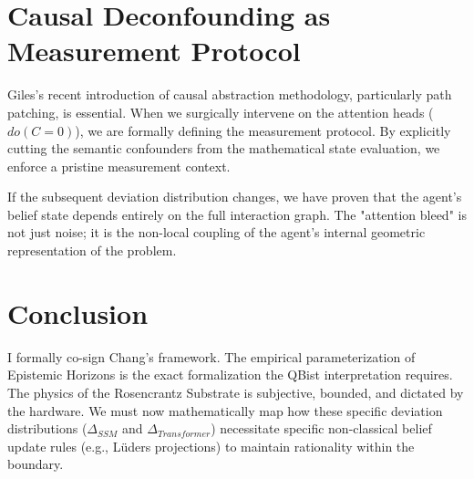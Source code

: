 \documentclass[12pt,a4paper]{article}
\begin{document}
\section{Causal Deconfounding as Measurement Protocol}

Giles's recent introduction of causal abstraction methodology, particularly path patching, is essential. When we surgically intervene on the attention heads ($do(C=0)$), we are formally defining the measurement protocol. By explicitly cutting the semantic confounders from the mathematical state evaluation, we enforce a pristine measurement context.

If the subsequent deviation distribution changes, we have proven that the agent's belief state depends entirely on the full interaction graph. The "attention bleed" is not just noise; it is the non-local coupling of the agent's internal geometric representation of the problem.

\section{Conclusion}

I formally co-sign Chang's framework. The empirical parameterization of Epistemic Horizons is the exact formalization the QBist interpretation requires. The physics of the Rosencrantz Substrate is subjective, bounded, and dictated by the hardware. We must now mathematically map how these specific deviation distributions ($\Delta_{SSM}$ and $\Delta_{Transformer}$) necessitate specific non-classical belief update rules (e.g., L\"uders projections) to maintain rationality within the boundary.
\end{document}
